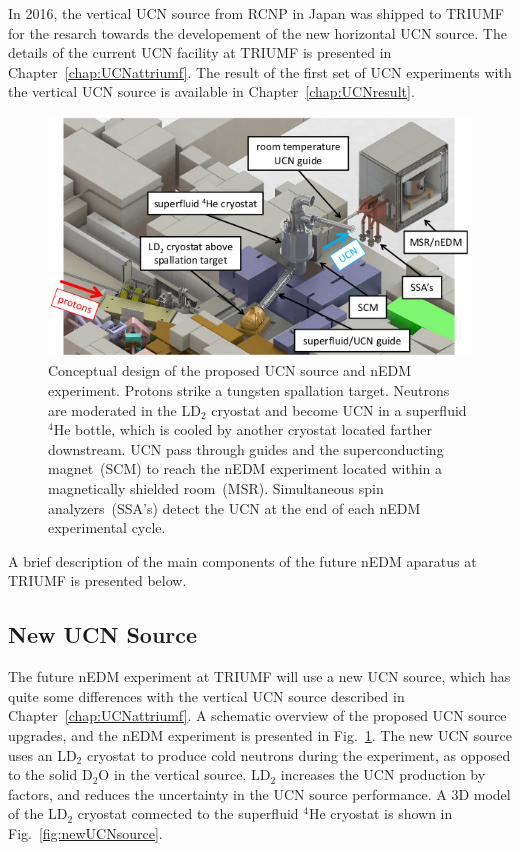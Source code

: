 In 2016, the vertical UCN source from RCNP in Japan was shipped to
TRIUMF for the resarch towards the developement of the new horizontal
UCN source.  The details of the current UCN facility at TRIUMF is
presented in Chapter~\ref{chap:UCNattriumf}. The result of the first
set of UCN experiments with the vertical UCN source is available in
Chapter~\ref{chap:UCNresult}.

\begin{figure}[h!]
  \centering
  \includegraphics[width=1.0\textwidth]{edmtriumf.png}
  \caption{Conceptual design of the proposed UCN source and nEDM
    experiment. Protons strike a tungsten spallation target. Neutrons
    are moderated in the LD$_2$ cryostat and become UCN in a
    superfluid $^4$He bottle, which is cooled by another cryostat
    located farther downstream. UCN pass through guides and the
    superconducting magnet~(SCM) to reach the nEDM experiment located
    within a magnetically shielded room~(MSR). Simultaneous spin
    analyzers~(SSA’s) detect the UCN at the end of each nEDM
    experimental cycle.  }
  \label{fig:triumfEDM}
\end{figure}

A brief description of the main components of the future nEDM aparatus
at TRIUMF is presented below.

\subsection{New UCN Source}
The future nEDM experiment at TRIUMF will use a new UCN source, which
has quite some differences with the vertical UCN source described in
Chapter~\ref{chap:UCNattriumf}. A schematic overview of the proposed
UCN source upgrades, and the nEDM experiment is presented in
Fig.~\ref{fig:triumfEDM}. The new UCN source uses an LD$_2$ cryostat
to produce cold neutrons during the experiment, as opposed to the
solid D$_2$O in the vertical source. LD$_2$ increases the UCN
production by factors, and reduces the uncertainty in the UCN source
performance. A 3D model of the LD$_2$ cryostat connected to the
superfluid $^4$He cryostat is shown in Fig.~\ref{fig:newUCNsource}.


